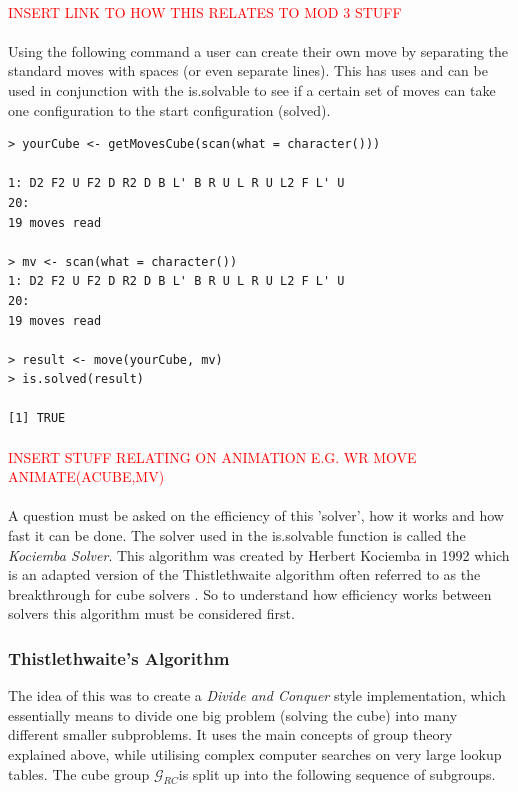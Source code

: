 \documentclass{article}
\begin{document}
\paragraph*{}
\textcolor{red}{INSERT LINK TO HOW THIS RELATES TO MOD 3 STUFF}
\paragraph*{}
Using the following command a user can create their own move by separating the standard moves with spaces (or even separate lines). This has uses and can be used in conjunction with the is.solvable to see if a certain set of moves can take one configuration to the start configuration (solved).
\begin{lstlisting}
> yourCube <- getMovesCube(scan(what = character()))

1: D2 F2 U F2 D R2 D B L' B R U L R U L2 F L' U
20:
19 moves read

> mv <- scan(what = character())
1: D2 F2 U F2 D R2 D B L' B R U L R U L2 F L' U
20:
19 moves read

> result <- move(yourCube, mv)
> is.solved(result)

[1] TRUE
\end{lstlisting}
\paragraph*{}
\textcolor{red}{INSERT STUFF RELATING ON ANIMATION E.G. WR MOVE ANIMATE(ACUBE,MV)}
\paragraph*{}

A question must be asked on the efficiency of this 'solver', how it works and how fast it can be done. 
The solver used in the is.solvable function is called the \textit{Kociemba Solver}. This algorithm was created by Herbert Kociemba in 1992 which is an adapted version of the Thistlethwaite algorithm often referred to as the breakthrough for cube solvers %
. So to understand how efficiency works between solvers this algorithm must be considered first.

\subsubsection*{Thistlethwaite's Algorithm}

The idea of this was to create a \textit{Divide and Conquer} style implementation, which essentially means to divide one big problem (solving the cube) into many different smaller subproblems. It uses the main concepts of group theory explained above, while utilising complex computer searches on very large lookup tables. 
The cube group $\mathcal{G}_{RC}$is split up into the following sequence of subgroups.  
\end{document}
